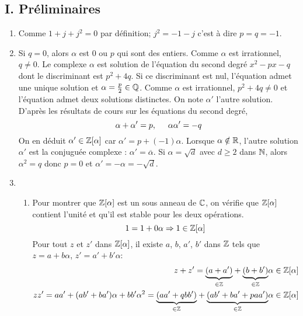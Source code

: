 \subsection*{I. Préliminaires}
\begin{enumerate}
  \item Comme $1+j+j^2=0$ par définition; $j^2 = -1 - j$ c'est à dire $p=q=-1$.
  
  \item Si $q=0$, alors $\alpha$ est $0$ ou $p$ qui sont des entiers. Comme $\alpha$ est irrationnel, $q\neq0$.\newline
  Le complexe $\alpha$ est solution de l'équation du second degré $x^2-px-q$ dont le discriminant est $p^2+4q$. Si ce discriminant est nul, l'équation admet une unique solution et $\alpha = \frac{p}{2}\in \mathbb{Q}$. Comme $\alpha$ est irrationnel, $p^2+4q\neq 0$ et l'équation admet deux solutions distinctes. On note $\alpha'$ l'autre solution. D'après les résultats de cours sur les équations du second degré,
  \begin{displaymath}
    \alpha + \alpha' = p, \hspace{0.5cm} \alpha \alpha' = -q
  \end{displaymath}
On en déduit $\alpha'\in \mathbb{Z}[\alpha]$ car $\alpha' = p +(-1)\alpha$. Lorsque $\alpha \notin \mathbb{R}$, l'autre solution $\alpha'$ est la conjuguée complexe : $\alpha' = \overline{\alpha}$. \newline
Si $\alpha = \sqrt{d}$ avec $d\geq 2$ dans $\mathbb{N}$, alors $\alpha^2 = q$ donc $p=0$ et $\alpha' = -\alpha=-\sqrt{d}$.
  
  \item
  \begin{enumerate}
    \item Pour montrer que $\mathbb{Z}[\alpha]$ est un sous anneau de $\mathbb{C}$, on vérifie que $\mathbb{Z}[\alpha]$ contient l'unité et qu'il est stable pour les deux opérations.
    \begin{displaymath}
    1 = 1 + 0\alpha \Rightarrow 1 \in \mathbb{Z}[\alpha]\\
    \end{displaymath}
    Pour tout $z$ et $z'$ dans $\mathbb{Z}[\alpha]$, il existe $a$, $b$, $a'$, $b'$ dans $\mathbb{Z}$ tels que $z=a+b\alpha$, $z'=a'+b'\alpha$:
    \begin{align*}
      z+z' = \underset{\in \mathbb{Z}}{\underbrace{(a+a')}} + \underset{\in \mathbb{Z}}{\underbrace{(b+b')}}\alpha &\in \mathbb{Z}[\alpha]\\
      zz' = aa' + (ab'+ba')\alpha + bb'\alpha^2 
      = \underset{\in \mathbb{Z}}{\underbrace{(aa'+qbb')}} + \underset{\in \mathbb{Z}}{\underbrace{(ab'+ba'+paa')}}\alpha &\in \mathbb{Z}[\alpha]
    \end{align*}


\end{enumerate}
\end{enumerate}
